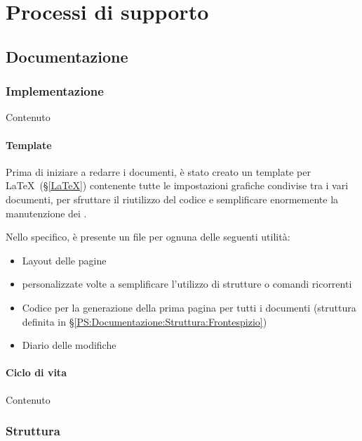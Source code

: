 
\section{Processi di supporto}\label{PS}

	\subsection{Documentazione}\label{PS:Documentazione}


		\subsubsection{Implementazione}\label{PS:Documentazione:Implementazione}
		Contenuto

			\paragraph{Template}\label{PS:Documentazione:Implementazione:Template}
			Prima di iniziare a redarre i documenti, è stato creato un template per \LaTeX \ (\S\ref{LaTeX})
			contenente tutte le impostazioni grafiche condivise tra i vari documenti, per sfruttare il riutilizzo
			del codice e semplificare enormemente la manutenzione dei .\par
			Nello specifico, è presente un file per ognuna delle seguenti utilità:
			\begin{itemize}
				\item Layout delle pagine
				\item {} personalizzate volte a semplificare l'utilizzo di strutture o comandi ricorrenti
				\item Codice per la generazione della prima pagina per tutti i documenti
					(struttura definita in \S\ref{PS:Documentazione:Struttura:Frontespizio})
				\item Diario delle modifiche
			\end{itemize}

			\paragraph{Ciclo di vita}\label{PS:Documentazione:Implementazione:CicloVita}
			Contenuto

		\subsubsection{Struttura}\label{PS:Documentazione:Struttura}

